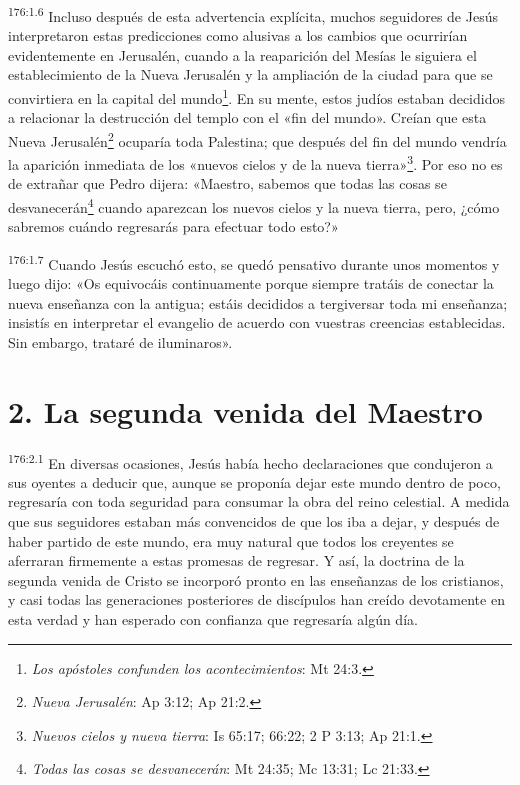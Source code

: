 \par
\textsuperscript{176:1.6} Incluso después de esta advertencia explícita, muchos seguidores de Jesús interpretaron estas predicciones como alusivas a los cambios que ocurrirían evidentemente en Jerusalén, cuando a la reaparición del Mesías le siguiera el establecimiento de la Nueva Jerusalén y la ampliación de la ciudad para que se convirtiera en la capital del mundo\footnote{\textit{Los apóstoles confunden los acontecimientos}: Mt 24:3.}. En su mente, estos judíos estaban decididos a relacionar la destrucción del templo con el «fin del mundo». Creían que esta Nueva Jerusalén\footnote{\textit{Nueva Jerusalén}: Ap 3:12; Ap 21:2.} ocuparía toda Palestina; que después del fin del mundo vendría la aparición inmediata de los «nuevos cielos y de la nueva tierra»\footnote{\textit{Nuevos cielos y nueva tierra}: Is 65:17; 66:22; 2 P 3:13; Ap 21:1.}. Por eso no es de extrañar que Pedro dijera: «Maestro, sabemos que todas las cosas se desvanecerán\footnote{\textit{Todas las cosas se desvanecerán}: Mt 24:35; Mc 13:31; Lc 21:33.} cuando aparezcan los nuevos cielos y la nueva tierra, pero, ¿cómo sabremos cuándo regresarás para efectuar todo esto?»

\par
\textsuperscript{176:1.7} Cuando Jesús escuchó esto, se quedó pensativo durante unos momentos y luego dijo: «Os equivocáis continuamente porque siempre tratáis de conectar la nueva enseñanza con la antigua; estáis decididos a tergiversar toda mi enseñanza; insistís en interpretar el evangelio de acuerdo con vuestras creencias establecidas. Sin embargo, trataré de iluminaros».

\section*{2. La segunda venida del Maestro}
\par
\textsuperscript{176:2.1} En diversas ocasiones, Jesús había hecho declaraciones que condujeron a sus oyentes a deducir que, aunque se proponía dejar este mundo dentro de poco, regresaría con toda seguridad para consumar la obra del reino celestial. A medida que sus seguidores estaban más convencidos de que los iba a dejar, y después de haber partido de este mundo, era muy natural que todos los creyentes se aferraran firmemente a estas promesas de regresar. Y así, la doctrina de la segunda venida de Cristo se incorporó pronto en las enseñanzas de los cristianos, y casi todas las generaciones posteriores de discípulos han creído devotamente en esta verdad y han esperado con confianza que regresaría algún día.

